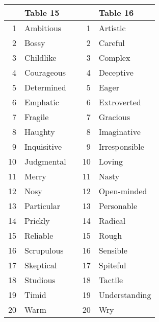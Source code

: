 \documentclass[12pt]{article}
\begin{document}
\begin{tabular}{r|l l r|l}
 & Table 15 & & & Table 16 \\\hline
 1 & Ambitious & &  1 & Artistic\\
 2 & Bossy & &  2 & Careful\\
 3 & Childlike & &  3 & Complex\\
 4 & Courageous & &  4 & Deceptive\\
 5 & Determined & &  5 & Eager\\
 6 & Emphatic & &  6 & Extroverted\\
 7 & Fragile & &  7 & Gracious\\
 8 & Haughty & &  8 & Imaginative\\
 9 & Inquisitive & &  9 & Irresponsible\\
10 & Judgmental & & 10 & Loving\\
11 & Merry & & 11 & Nasty\\
12 & Nosy & & 12 & Open-minded\\
13 & Particular & & 13 & Personable\\
14 & Prickly & & 14 & Radical\\
15 & Reliable & & 15 & Rough\\
16 & Scrupulous & & 16 & Sensible\\
17 & Skeptical & & 17 & Spiteful\\
18 & Studious & & 18 & Tactile\\
19 & Timid & & 19 & Understanding\\
20 & Warm & & 20 & Wry\\
\end{tabular}
\end{document}
